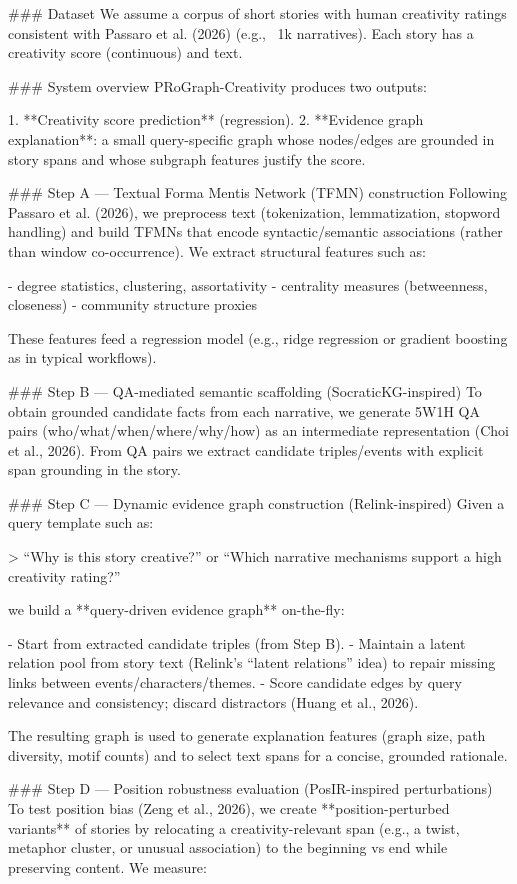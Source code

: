 ### Dataset  
We assume a corpus of short stories with human creativity ratings consistent with Passaro et al. (2026) (e.g., ~1k narratives). Each story has a creativity score (continuous) and text.

### System overview  
PRoGraph-Creativity produces two outputs:

1. **Creativity score prediction** (regression).  
2. **Evidence graph explanation**: a small query-specific graph whose nodes/edges are grounded in story spans and whose subgraph features justify the score.

### Step A — Textual Forma Mentis Network (TFMN) construction  
Following Passaro et al. (2026), we preprocess text (tokenization, lemmatization, stopword handling) and build TFMNs that encode syntactic/semantic associations (rather than window co-occurrence). We extract structural features such as:

- degree statistics, clustering, assortativity  
- centrality measures (betweenness, closeness)  
- community structure proxies

These features feed a regression model (e.g., ridge regression or gradient boosting as in typical workflows).

### Step B — QA-mediated semantic scaffolding (SocraticKG-inspired)  
To obtain grounded candidate facts from each narrative, we generate 5W1H QA pairs (who/what/when/where/why/how) as an intermediate representation (Choi et al., 2026). From QA pairs we extract candidate triples/events with explicit span grounding in the story.

### Step C — Dynamic evidence graph construction (Relink-inspired)  
Given a query template such as:

> “Why is this story creative?” or “Which narrative mechanisms support a high creativity rating?”

we build a **query-driven evidence graph** on-the-fly:

- Start from extracted candidate triples (from Step B).  
- Maintain a latent relation pool from story text (Relink’s “latent relations” idea) to repair missing links between events/characters/themes.  
- Score candidate edges by query relevance and consistency; discard distractors (Huang et al., 2026).  

The resulting graph is used to generate explanation features (graph size, path diversity, motif counts) and to select text spans for a concise, grounded rationale.

### Step D — Position robustness evaluation (PosIR-inspired perturbations)  
To test position bias (Zeng et al., 2026), we create **position-perturbed variants** of stories by relocating a creativity-relevant span (e.g., a twist, metaphor cluster, or unusual association) to the beginning vs end while preserving content. We measure:

